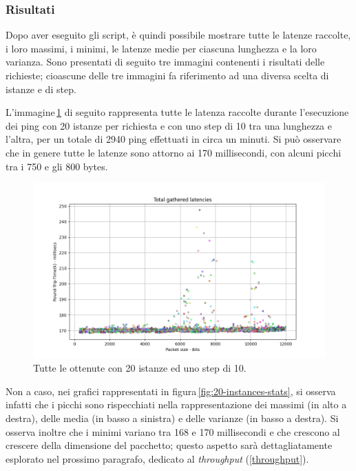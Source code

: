 \vspace{10px}\subsubsection*{Risultati}

\noindent Dopo aver eseguito gli script, è quindi possibile mostrare tutte le latenze raccolte, i loro massimi, i minimi, le latenze medie per ciascuna lunghezza e la loro varianza. Sono presentati di seguito tre immagini contenenti i risultati delle richieste; cioascune delle tre immagini fa riferimento ad una diversa scelta di istanze e di step.

L'immagine\,\ref{fig:20-instances-total} di seguito rappresenta tutte le latenza raccolte durante l'esecuzione dei ping con 20 istanze per richiesta e con uno step di 10 tra una lunghezza e l'altra, per un totale di 2940 ping effettuati in circa un minuti. Si può osservare che in genere tutte le latenze sono attorno ai 170 millisecondi, con alcuni picchi tra i 750 e gli 800 bytes.
\begin{figure}[h]
    \centering
    \includegraphics[width = .9\textwidth]{hw-2/report/imgs/20-instances/la-total-latencies.png}
    \caption{Tutte le ottenute con 20 istanze ed uno step di 10.}
    \label{fig:20-instances-total}
\end{figure}
Non a caso, nei grafici rappresentati in figura\,\ref{fig:20-instances-stats}, si osserva infatti che i picchi sono rispecchiati nella rappresentazione dei massimi (in alto a destra), delle media (in basso a sinistra) e delle varianze (in basso a destra). Si osserva inoltre che i minimi variano tra 168 e 170 millisecondi e che crescono al crescere della dimensione del pacchetto; questo aspetto sarà dettagliatamente esplorato nel prossimo paragrafo, dedicato al \textsl{throughput} (\ref{throughput}).
